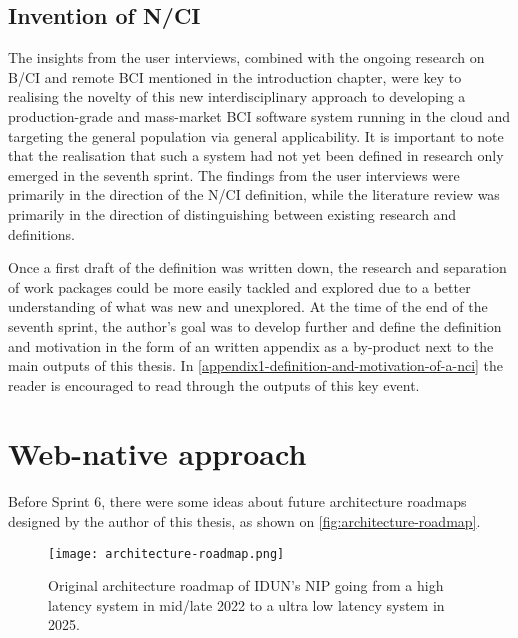 \subsection{Invention of N/CI}
\label{chapter4-invention-of-nci}

The insights from the user interviews, combined with the ongoing research on B/CI and remote BCI mentioned in the introduction chapter, were key to realising the novelty of this new interdisciplinary approach to developing a production-grade and mass-market BCI software system running in the cloud and targeting the general population via general applicability. It is important to note that the realisation that such a system had not yet been defined in research only emerged in the seventh sprint. The findings from the user interviews were primarily in the direction of the N/CI definition, while the literature review was primarily in the direction of distinguishing between existing research and definitions.

Once a first draft of the definition was written down, the research and separation of work packages could be more easily tackled and explored due to a better understanding of what was new and unexplored. At the time of the end of the seventh sprint, the author's goal was to develop further and define the definition and motivation in the form of an written appendix as a by-product next to the main outputs of this thesis. In \autoref{appendix1-definition-and-motivation-of-a-nci} the reader is encouraged to read through the outputs of this key event.

\section*{Web-native approach}
\label{chapter4-web-native-approach}

Before Sprint 6, there were some ideas about future architecture roadmaps designed by the author of this thesis, as shown on \autoref{fig:architecture-roadmap}.

\begin{figure}[!ht]
  \centering
  \texttt{[image: architecture-roadmap.png]}
  \caption{Original architecture roadmap of IDUN's NIP going from a high latency system in mid/late 2022 to a ultra low latency system in 2025.}
  \label{fig:architecture-roadmap}
\end{figure}

